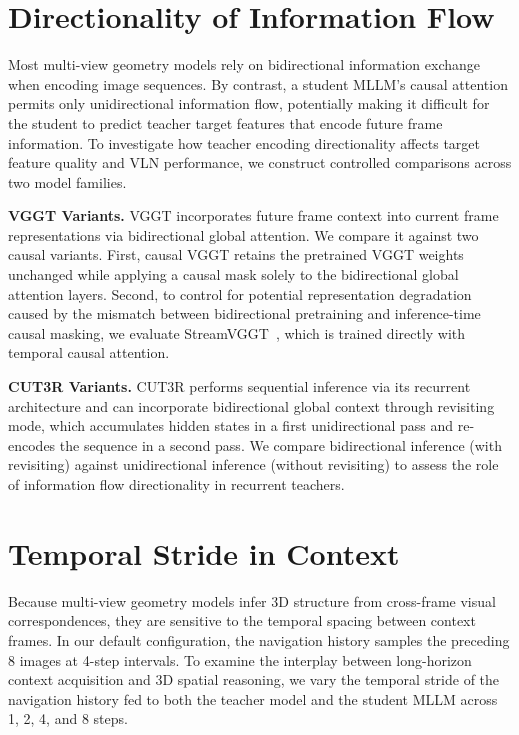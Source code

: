 \section{Directionality of Information Flow}
\label{sec:directionality}

Most multi-view geometry models rely on bidirectional information exchange when encoding image sequences. By contrast, a student MLLM's causal attention permits only unidirectional information flow, potentially making it difficult for the student to predict teacher target features that encode future frame information. To investigate how teacher encoding directionality affects target feature quality and VLN performance, we construct controlled comparisons across two model families.

\textbf{VGGT Variants.} VGGT incorporates future frame context into current frame representations via bidirectional global attention. We compare it against two causal variants. First, causal VGGT retains the pretrained VGGT weights unchanged while applying a causal mask solely to the bidirectional global attention layers. Second, to control for potential representation degradation caused by the mismatch between bidirectional pretraining and inference-time causal masking, we evaluate StreamVGGT~\cite{zhuo2026streamvggt}, which is trained directly with temporal causal attention.

\textbf{CUT3R Variants.} CUT3R performs sequential inference via its recurrent architecture and can incorporate bidirectional global context through revisiting mode, which accumulates hidden states in a first unidirectional pass and re-encodes the sequence in a second pass. We compare bidirectional inference (with revisiting) against unidirectional inference (without revisiting) to assess the role of information flow directionality in recurrent teachers.

\section{Temporal Stride in Context}
\label{sec:temporal_stride}

Because multi-view geometry models infer 3D structure from cross-frame visual correspondences, they are sensitive to the temporal spacing between context frames. In our default configuration, the navigation history samples the preceding 8 images at 4-step intervals. To examine the interplay between long-horizon context acquisition and 3D spatial reasoning, we vary the temporal stride of the navigation history fed to both the teacher model and the student MLLM across 1, 2, 4, and 8 steps.


